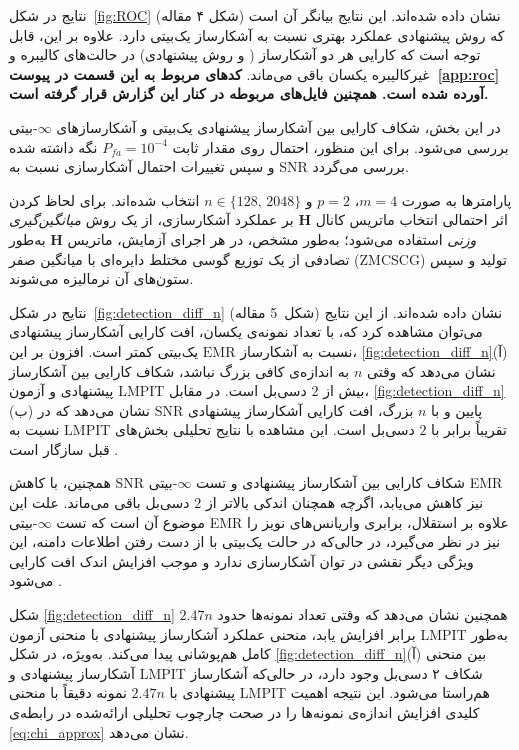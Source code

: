 نتایج در شکل~\ref{fig:ROC} (شکل ۴ مقاله) نشان داده شده‌اند.  
این نتایج بیانگر آن است که روش پیشنهادی عملکرد بهتری نسبت به آشکارساز  یک‌بیتی دارد.  
علاوه بر این، قابل توجه است که کارایی هر دو آشکارساز ( و روش پیشنهادی) 
در حالت‌های کالیبره و غیرکالیبره یکسان باقی می‌ماند.  
\linebreak
\textbf{
	کدهای مربوط به این قسمت در  پیوست~\ref{app:roc} آورده شده است. همچنین فایل‌های مربوطه در کنار این گزارش قرار گرفته است.
}


در این بخش، شکاف کارایی بین آشکارساز پیشنهادی یک‌بیتی و آشکارسازهای $\infty$-بیتی بررسی می‌شود.  
برای این منظور، احتمال  روی مقدار ثابت $P_{fa}=10^{-4}$ نگه داشته شده و سپس تغییرات احتمال آشکارسازی نسبت به SNR بررسی می‌گردد.  

پارامترها به صورت $m=4$، $p=2$ و $n\in\{128,\,2048\}$ انتخاب شده‌اند.  
برای لحاظ کردن اثر احتمالی انتخاب ماتریس کانال $\mathbf{H}$ بر عملکرد آشکارسازی، از یک روش \emph{میانگین‌گیری وزنی} استفاده می‌شود؛  
به‌طور مشخص، در هر اجرای آزمایش، ماتریس $\mathbf{H}$ به‌طور تصادفی از یک توزیع گوسی مختلط دایره‌ای با میانگین صفر (ZMCSCG) تولید و سپس ستون‌های آن نرمالیزه می‌شوند.  

نتایج در شکل~\ref{fig:detection_diff_n} (شکل~5 مقاله) نشان داده شده‌اند.  
از این نتایج می‌توان مشاهده کرد که، با تعداد نمونه‌ی یکسان، افت کارایی آشکارساز پیشنهادی نسبت به آشکارساز $\mathrm{EMR}$ یک‌بیتی کمتر است.  
افزون بر این، \ref{fig:detection_diff_n}(آ) نشان می‌دهد که وقتی $n$ به اندازه‌ی کافی بزرگ نباشد، شکاف کارایی بین آشکارساز پیشنهادی و آزمون LMPIT بیش از $2$ دسی‌بل است.  
در مقابل، \ref{fig:detection_diff_n}(ب) نشان می‌دهد که در SNR پایین و با $n$ بزرگ، افت کارایی آشکارساز پیشنهادی نسبت به LMPIT تقریباً برابر با $2$ دسی‌بل است.  
این مشاهده با نتایج تحلیلی بخش‌های قبل سازگار است .  

همچنین، با کاهش SNR شکاف کارایی بین آشکارساز پیشنهادی و تست $\infty$-بیتی EMR نیز کاهش می‌یابد، اگرچه همچنان اندکی بالاتر از $2$ دسی‌بل باقی می‌ماند.  
علت این موضوع آن است که تست $\infty$-بیتی EMR علاوه بر استقلال، برابری واریانس‌های نویز را نیز در نظر می‌گیرد، در حالی‌که در حالت یک‌بیتی با از دست رفتن اطلاعات دامنه، این ویژگی دیگر نقشی در توان آشکارسازی ندارد و موجب افزایش اندک افت کارایی می‌شود .  

شکل \ref{fig:detection_diff_n} همچنین نشان می‌دهد که وقتی تعداد نمونه‌ها حدود $2.47n$ برابر افزایش یابد، منحنی عملکرد آشکارساز پیشنهادی با منحنی آزمون LMPIT به‌طور کامل هم‌پوشانی پیدا می‌کند.  
به‌ویژه، در شکل \ref{fig:detection_diff_n}(آ) بین منحنی آشکارساز پیشنهادی و LMPIT شکاف ۲ دسی‌بل وجود دارد، در حالی‌که آشکارساز پیشنهادی با $2.47n$ نمونه دقیقاً با منحنی LMPIT هم‌راستا می‌شود.  
این نتیجه اهمیت کلیدی افزایش اندازه‌ی نمونه‌ها را در صحت چارچوب تحلیلی ارائه‌شده در رابطه‌ی \eqref{eq:chi_approx} نشان می‌دهد.

